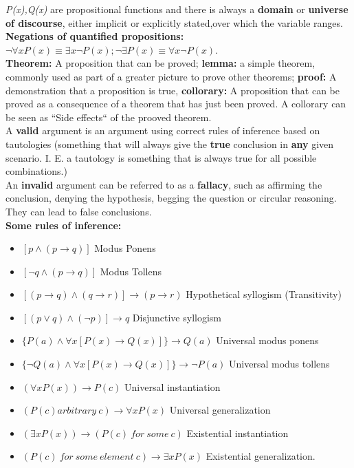 \documentclass[12pt]{article}
\begin{document}
\textit{P(x),Q(x)} are propositional functions and there is always a \textbf{domain} or \textbf{universe of discourse}, either implicit or explicitly stated,over which the variable ranges. \\
\medskip
\textbf{Negations of quantified propositions:} $\neg \forall xP(x)\equiv \exists x\neg P(x); \neg \exists P(x) \equiv \forall x \neg P(x)$. \\
\medskip
\textbf{Theorem:} A proposition that can be proved; \textbf{lemma:} a simple theorem, commonly used as part of a greater picture to prove other theorems; \textbf{proof:} A demonstration that a proposition is true, \textbf{collorary:} A proposition that can be proved as a consequence of a theorem that has just been proved. A collorary can be seen as ``Side effects`` of the prooved theorem. \\
\medskip
A \textbf{valid} argument is an argument using correct rules of inference based on tautologies (something that will always give the \textbf{true} conclusion in \textbf{any} given scenario. I. E. a tautology is something that is always true for all possible combinations.) \\
An \textbf{invalid} argument can be referred to as a \textbf{fallacy}, such as affirming the conclusion, denying the hypothesis, begging the question or circular reasoning. They can lead to false conclusions. \\
\medskip
\textbf{Some rules of inference:} 
\begin{itemize}
\item $[ p \wedge (p \rightarrow q) ]$ Modus Ponens
\item $[ \neg q \wedge (p \rightarrow q)]$ Modus Tollens
\item $[(p \rightarrow q) \wedge (q \rightarrow r)] \rightarrow (p \rightarrow r)$ Hypothetical syllogism (Transitivity)
\item $[(p \vee q) \wedge (\neg p)] \rightarrow q$ Disjunctive syllogism
\item $\{P(a) \wedge \forall x [P(x) \rightarrow Q(x)]\} \rightarrow Q(a)$ Universal modus ponens
\item $\{\neg Q(a) \wedge \forall x[P(x) \rightarrow Q(x)]\} \rightarrow \neg P(a)$ Universal modus tollens
\item $(\forall x P(x)) \rightarrow P(c)$ Universal instantiation
\item $(P(c) arbitrary\ c) \rightarrow \forall xP(x)$ Universal generalization
\item $(\exists xP(x)) \rightarrow (P(c)\ for\ some\ c)$ Existential instantiation
\item $(P(c)\ for\ some\ element\ c) \rightarrow \exists x P(x)$ Existential generalization.
\end{itemize}
\newpage
\end{document}
